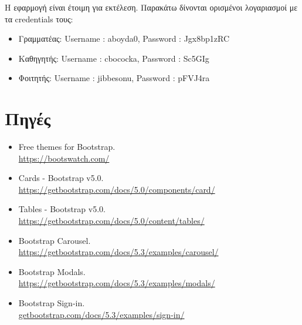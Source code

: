 \documentclass[12pt]{article}
\begin{document}
Η εφαρμογή είναι έτοιμη για εκτέλεση. Παρακάτω δίνονται ορισμένοι λογαριασμοί με τα credentials τους:

\begin{itemize}
	\item Γραμματέας: Username : aboyda0, Password : Jgx8bp1zRC
	\item Καθηγητής: Username : cbococka, Password : Sc5GIg
	\item Φοιτητής: Username : jibbesonu, Password : pFVJ4ra
\end{itemize}

\section{Πηγές}

\begin{itemize}
	\item Free themes for Bootstrap.\\
	\url{https://bootswatch.com/}
	
	\item Cards - Bootstrap v5.0.\\
	\url{https://getbootstrap.com/docs/5.0/components/card/}
	
	\item Tables - Bootstrap v5.0.\\
	\url{https://getbootstrap.com/docs/5.0/content/tables/}
	
	\item Bootstrap Carousel.\\
	\url{https://getbootstrap.com/docs/5.3/examples/carousel/}
	
	\item Bootstrap Modals.\\
	\url{https://getbootstrap.com/docs/5.3/examples/modals/}
	
	\item Bootstrap Sign-in.\\
	\url{getbootstrap.com/docs/5.3/examples/sign-in/}
\end{itemize}
\end{document}
